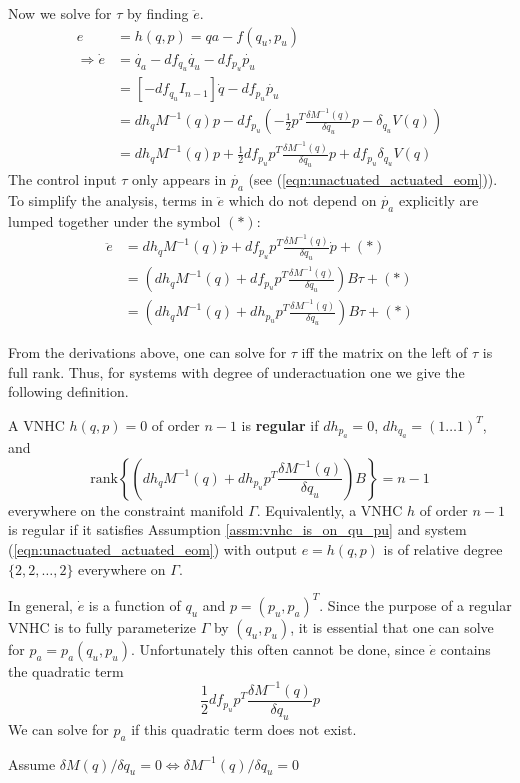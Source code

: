 Now we solve for \(\tau\) by finding \(\ddot{e}\).
\begin{align*}
    e &= h(q,p) = qa - f(q_u,p_u)\\
    \Rightarrow \dot{e} &= \dot{q_a} - df_{q_u}\dot{q_u} -df_{p_u}\dot{p_u} \\
    &= [-df_{q_u} I_{n-1}]\dot{q} - df_{p_u} \dot{p_u} \\
    &= dh_q M^{-1}(q) p - df_{p_u}\left( -\frac{1}{2}p^T \frac{\delta M^{-1}(q)}{\delta q_u} p - \delta_{q_u}V(q) \right) \\
    &= dh_q M^{-1}(q) p + \frac{1}{2}df_{p_u} p^T \frac{\delta M^{-1}(q)}{\delta q_u} p + df_{p_u}\delta_{q_u}V(q)
\end{align*}
The control input \(\tau\) only appears in \(\dot{p_a}\) (see (\ref{eqn:unactuated_actuated_eom})). To simplify the analysis, terms in \(\ddot{e}\) which do not depend on \(\dot{p_a}\) explicitly are lumped together under the symbol \((*)\):
\begin{align*}
    \ddot{e} &= dh_q M^{-1}(q) \dot{p} + df_{p_u} p^T \frac{\delta M^{-1}(q)}{\delta q_u} \dot{p} + (*) \\
    &= (dh_q M^{-1}(q) + df_{p_u} p^T \frac{\delta M^{-1}(q)}{\delta q_u})B\tau + (*) \\
    &= (dh_q M^{-1}(q) + dh_{p_u} p^T \frac{\delta M^{-1}(q)}{\delta q_u})B\tau + (*)
\end{align*}

From the derivations above, one can solve for \(\tau\) iff the matrix on the left of \(\tau\) is full rank. Thus, for systems with degree of underactuation one we give the following definition.
\begin{defn}
A VNHC \(h(q,p) = 0\) of order \(n - 1\) is \textbf{regular} if \(dh_{p_a} = 0\), \(dh_{q_a} = (1 \ldots 1)^T\), and 
\[
\text{rank}\left\{ (dh_q M^{-1}(q) + dh_{p_u} p^T \frac{\delta M^{-1}(q)}{\delta q_u})B\right\} = n - 1
\]
everywhere on the constraint manifold \(\Gamma\). Equivalently, a VNHC \(h\) of order \(n - 1\) is regular if it satisfies Assumption \ref{assm:vnhc_is_on_qu_pu} and system (\ref{eqn:unactuated_actuated_eom}) with output \(e = h(q,p)\) is of relative degree \(\{2,2,\ldots,2\}\) everywhere on \(\Gamma\).
\end{defn}

In general, \(\dot{e}\) is a function of \(q_u\) and \(p = (p_u,p_a)^T\). Since the purpose of a regular VNHC is to fully parameterize \(\Gamma\) by \((q_u,p_u)\), it is essential that one can solve for \(p_a = p_a(q_u,p_u)\). Unfortunately this often cannot be done, since \(\dot{e}\) contains the quadratic term
\[
\frac{1}{2} df_{p_u} p^T \frac{\delta M^{-1}(q)}{\delta q_u} p 
\]
We can solve for \(p_a\) if this quadratic term does not exist.
\begin{assm}\label{assm:M_is_Mqa}
Assume \(\delta M(q) / \delta q_u = 0 \Leftrightarrow \delta M^{-1}(q) / \delta q_u = 0\)
\end{assm}

